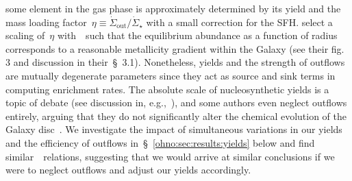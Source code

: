 some element in the gas phase is approximately determined by its yield and the
mass loading factor~$\eta \equiv \dot{\Sigma}_\text{out} / \dot{\Sigma}_\star$
with a small correction for the SFH.
\citet{Johnson2021} select a scaling of~$\eta$ with~\rgal~such that the
equilibrium abundance as a function of radius corresponds to a reasonable
metallicity gradient within the Galaxy (see their fig. 3 and discussion in
their~\S~3.1).
Nonetheless, yields and the strength of outflows are mutually degenerate
parameters since they act as source and sink terms in computing enrichment
rates.
The absolute scale of nucleosynthetic yields is a topic of debate (see
discussion in, e.g.,~\citealp{Griffith2021b}), and some authors even neglect
outflows entirely, arguing that they do not significantly alter the chemical
evolution of the Galaxy disc~\citep[e.g.][]{Spitoni2019, Spitoni2021}.
We investigate the impact of simultaneous variations in our yields and the
efficiency of outflows in~\S~\ref{ohno:sec:results:yields} below
and find similar~\ohno~relations, suggesting that we would arrive
at similar conclusions if we were to neglect outflows and adjust our yields
accordingly.

